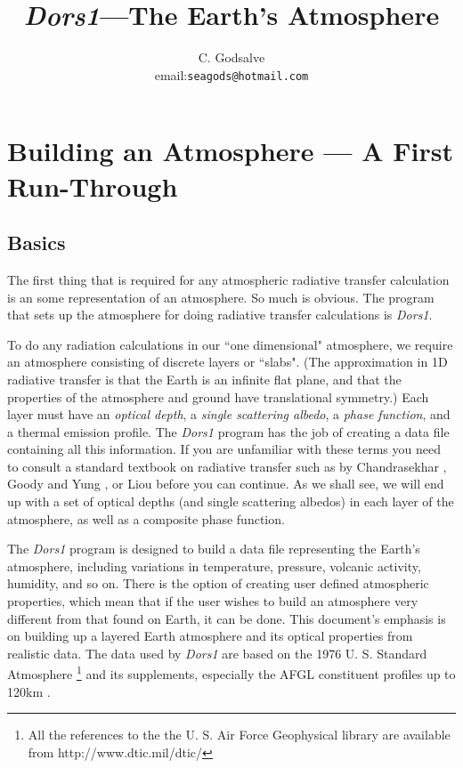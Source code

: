 \documentclass[12pt]{article}
\begin{document}



\thispagestyle{empty}

\title{{\it Dors1}---The Earth's Atmosphere}

\author{C. Godsalve \\
email:{\tt seagods@hotmail.com} }

\maketitle

\tableofcontents

\section{Building an Atmosphere --- A First Run-Through}

\subsection{Basics}

The first thing that is required for any atmospheric radiative transfer calculation is
an some representation of an atmosphere. So much is obvious. The program that sets up
the atmosphere for doing radiative transfer calculations is {\it Dors1}. 

To do any radiation calculations in our ``one dimensional" atmosphere, we 
require an atmosphere consisting of discrete
layers or ``slabs". (The approximation in 1D radiative transfer is that the Earth is an infinite  flat plane,
 and that the properties of the atmosphere and ground have translational symmetry.)
Each layer must have an {\it optical depth}, a {\it single scattering albedo}, 
a {\it phase function}, and a thermal emission profile. The {\it Dors1} program has the job of creating a
data file containing all this information. If you are unfamiliar with these terms you need
to consult a standard textbook on radiative transfer such as by Chandrasekhar \cite{Chandrasekhar:Mybib},
 Goody and Yung \cite{GoodyYung:Mybib}, or Liou \cite{Liou:Mybib} before you can continue.
As we shall see, we will end up with a set of optical depths (and single scattering albedos) in each layer of the atmosphere,
 as well as a composite phase function.

The  {\it Dors1} program is designed to build a data file representing the Earth's atmosphere, including
variations in temperature, pressure, volcanic activity, humidity, and so on.
There is the option of creating user defined atmospheric properties, which mean that if the user wishes
to build an atmosphere very different from that found on Earth, it can be done.
This document's emphasis is on 
building up a layered Earth atmosphere and its optical properties from realistic data. 
The data used by {\it Dors1} are based on
the 1976 U. S. Standard Atmosphere \footnote[1]{All the references to the the U. S. Air Force
Geophysical library are available from http://www.dtic.mil/dtic/}  \cite{USStandard:Mybib} and its supplements, especially the AFGL constituent
profiles up to 120km \cite{ConstProfs:Mybib}.
\end{document}
